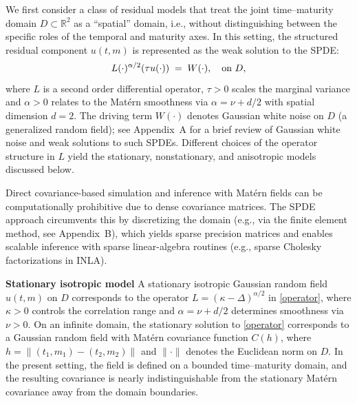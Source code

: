 \documentclass[
  12pt]{article}
\begin{document}
We first consider a class of residual models that treat the joint time--maturity domain $D\subset\mathbb{R}^2$ as a ``spatial'' domain, i.e., without distinguishing between the specific roles of the temporal and maturity axes. In this setting, the structured residual component $u(t,m)$ is represented as the weak solution to the SPDE:
\begin{equation}
    L(\cdot)^{\alpha/2} (\tau u(\cdot)) \;=\; W(\cdot), \quad \hbox{on } D,
    \label{operator}
\end{equation}
where $L$ is a second order differential operator, $\tau>0$ scales the marginal variance and $\alpha>0$ relates to the Matérn smoothness via $\alpha=\nu + d/2$ with spatial dimension $d=2$. The driving term $W(\cdot)$ denotes Gaussian white noise on $D$ (a generalized random field); see Appendix~A for a brief review of Gaussian white noise and weak solutions to such SPDEs. Different choices of the operator structure in $L$ yield the stationary, nonstationary, and anisotropic models discussed below. 

Direct covariance-based simulation and inference with Matérn fields can be computationally prohibitive due to dense covariance matrices. The SPDE approach circumvents this by discretizing the domain (e.g., via the finite element method, see Appendix~B), which yields sparse precision matrices and enables scalable inference with sparse linear-algebra routines (e.g., sparse Cholesky factorizations in INLA).

\textbf{Stationary isotropic model} 
A stationary isotropic Gaussian random field $u(t,m)$ on $D$ corresponds to the operator $L = (\kappa - \Delta)^{\alpha/2}$ in \eqref{operator}, where $\kappa>0$ controls the correlation range and $\alpha=\nu+d/2$ determines smoothness via $\nu>0$. On an infinite domain, the stationary solution to \eqref{operator} corresponds to a Gaussian random field with Matérn covariance function $C(h)$, where $h = \| (t_1,m_1)-(t_2,m_2)\|$ and $\| \cdot \|$ denotes the Euclidean norm on $D$. In the present setting, the field is defined on a bounded time--maturity domain, and the resulting covariance is nearly indistinguishable from the stationary Matérn covariance away from the domain boundaries. 
\end{document}
